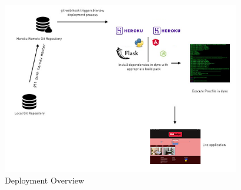\begin{figure}[H]
	\caption{Deployment Overview}
	\label{image:deploy}
	\centering
	\includegraphics[width=0.93\textwidth]{images/deploy.png}
\end{figure}